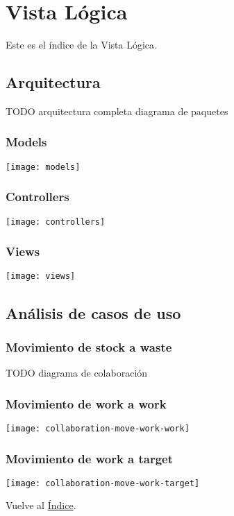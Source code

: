\newpage{}
\section{Vista Lógica}
Este es el índice de la Vista Lógica.

\newpage{}
\subsection{Arquitectura}
TODO arquitectura completa diagrama de paquetes

\newpage{}
\subsubsection{Models}
\texttt{[image: models]}

\newpage{}
\subsubsection{Controllers}
\texttt{[image: controllers]}

\newpage{}
\subsubsection{Views}
\texttt{[image: views]}

\newpage{}
\subsection{Análisis de casos de uso}

\subsubsection{Movimiento de stock a waste}
TODO diagrama de colaboración

\newpage{}
\subsubsection{Movimiento de work a work}
\texttt{[image: collaboration-move-work-work]}

\newpage{}
\subsubsection{Movimiento de work a target}
\texttt{[image: collaboration-move-work-target]}

Vuelve al \hyperlink{toc}{Índice}.

